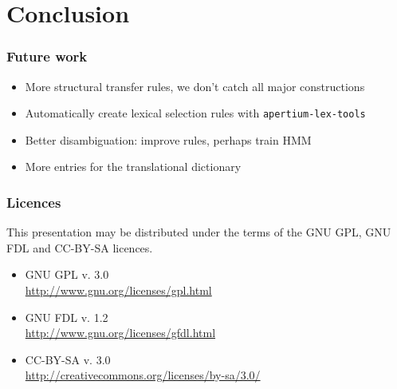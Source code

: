 \documentclass[notes=hide]{beamer}
\newcommand{\tool}[1]{\texttt{\small #1}}
\begin{document}
\section{Conclusion}
\begin{frame}\frametitle{Future work}
  \begin{itemize}
  \item More structural transfer rules, we don't catch all major
    constructions
  \item Automatically create lexical selection rules with
    \tool{apertium-lex-tools}
  \item Better disambiguation: improve rules, perhaps train HMM
  \item More entries for the translational dictionary
  \end{itemize}
\end{frame}

\begin{frame}\frametitle{Licences}
  This presentation may be distributed under the terms of the
  GNU GPL, GNU FDL and CC-BY-SA licences.
  \begin{itemize}
  \item GNU GPL v. 3.0 \\
    \href{http://www.gnu.org/licenses/gpl.html}{http://www.gnu.org/licenses/gpl.html}
  \item GNU FDL v. 1.2 \\
    \href{http://www.gnu.org/licenses/gfdl.html}{http://www.gnu.org/licenses/gfdl.html}
  \item CC-BY-SA v. 3.0 \\
    \href{http://creativecommons.org/licenses/by-sa/3.0/}{http://creativecommons.org/licenses/by-sa/3.0/}
  \end{itemize}
\end{frame}


\end{document}
